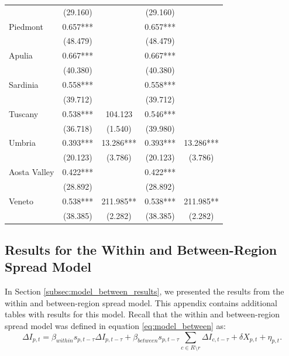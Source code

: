 \documentclass[12pt]{article}
\begin{document}
\begin{appendices}
\begin{longtable}{@{}lcccc@{}}
             & (29.160) &  & (29.160) &  \\ 
            Piedmont & 0.657*** &  & 0.657*** &  \\ 
             & (48.479) &  & (48.479) &  \\ 
            Apulia & 0.667*** &  & 0.667*** &  \\ 
             & (40.380) &  & (40.380) &  \\ 
            Sardinia & 0.558*** &  & 0.558*** &  \\ 
             & (39.712) &  & (39.712) &  \\ 
            Tuscany & 0.538*** & 104.123 & 0.546*** &  \\ 
             & (36.718) & (1.540) & (39.980) &  \\ 
            Umbria & 0.393*** & 13.286*** & 0.393*** & 13.286*** \\ 
             & (20.123) & (3.786) & (20.123) & (3.786) \\ 
            Aosta Valley & 0.422*** &  & 0.422*** &  \\ 
             & (28.892) &  & (28.892) &  \\ 
            Veneto & 0.538*** & 211.985** & 0.538*** & 211.985** \\ 
             & (38.385) & (2.282) & (38.385) & (2.282) \\* \bottomrule
        \end{longtable}
		
		\newpage
		\subsection{Results for the Within and Between-Region Spread Model} \label{sapp:model_between_results}
		In Section \ref{subsec:model_between_results}, we presented the results from the within and between-region spread model. This appendix contains additional tables with results for this model. Recall that the within and between-region spread model was defined in equation \eqref{eq:model_between} as:
		    \begin{equation*}
        		\Delta I_{p,t} = \beta_{within}s_{p,t-\tau}\Delta I_{p,t-\tau} + \beta_{between}s_{p,t-\tau}\sum_{c \in R \setminus r} \Delta I_{c, t-\tau} + \delta X_{p,t} + \eta_{p,t}.
        	\end{equation*}
        

\end{appendices}
\end{document}
